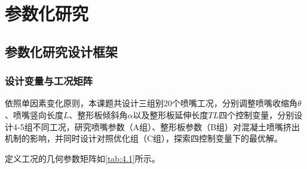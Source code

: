 \chapter{参数化研究}\label{chap:parametric}

\section{参数化研究设计框架}

\subsection{设计变量与工况矩阵}

依照单因素变化原则，本课题共设计三组别20个喷嘴工况，分别调整喷嘴收缩角$\theta$、喷嘴竖向长度$L$、整形板倾斜角$\alpha$以及整形板延伸长度$TL$四个控制变量，分别设计4-5组不同工况，研究喷嘴参数（A组）、整形板参数（B组）对混凝土喷嘴挤出机制的影响，并同时设计对照优化组（C组），探索四控制变量下的最优解。

定义工况的几何参数矩阵如\cref{tab:4.1}所示。

